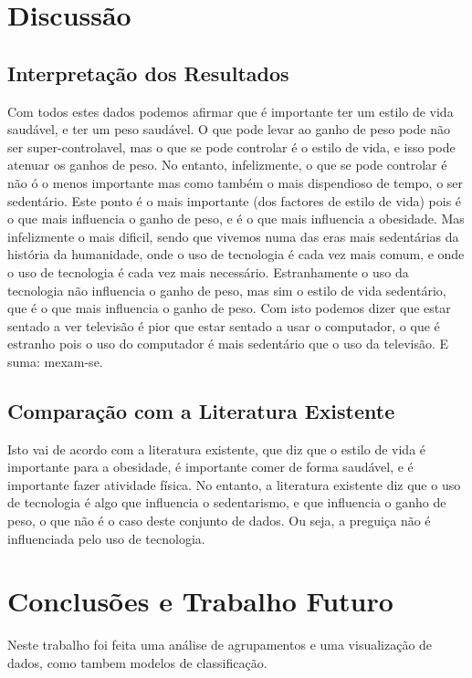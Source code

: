 \documentclass{easychair}
\begin{document}
\section{Discussão}
\subsection{Interpretação dos Resultados}

Com todos estes dados podemos afirmar que é importante ter um estilo de vida saudável, e ter um peso saudável. O que pode levar ao ganho de peso pode não ser super-controlavel, mas o que se pode controlar é o estilo de vida, e isso pode atenuar os ganhos de peso. No entanto, infelizmente, o que se pode controlar é não ó o menos importante mas como também o mais dispendioso de tempo, o ser sedentário. Este ponto é o mais importante (dos factores de estilo de vida) pois é o que mais influencia o ganho de peso, e é o que mais influencia a obesidade. Mas infelizmente o mais dificil, sendo que vivemos numa das eras mais sedentárias da história da humanidade, onde o uso de tecnologia é cada vez mais comum, e onde o uso de tecnologia é cada vez mais necessário. Estranhamente o uso da tecnologia não influencia o ganho de peso, mas sim o estilo de vida sedentário, que é o que mais influencia o ganho de peso. Com isto podemos dizer que estar sentado a ver televisão é pior que estar sentado a usar o computador, o que é estranho pois o uso do computador é mais sedentário que o uso da televisão. E suma: mexam-se.

\subsection{Comparação com a Literatura Existente}

Isto vai de acordo com a literatura existente, que diz que o estilo de vida é importante para a obesidade, é importante comer de forma saudável, e é importante fazer atividade física. No entanto, a literatura existente diz que o uso de tecnologia é algo que influencia o sedentarismo, e que influencia o ganho de peso, o que não é o caso deste conjunto de dados. Ou seja, a preguiça não é influenciada pelo uso de tecnologia.


\section{Conclusões e Trabalho Futuro}

Neste trabalho foi feita uma análise de agrupamentos e uma visualização de dados, como tambem modelos de classificação.
\end{document}
